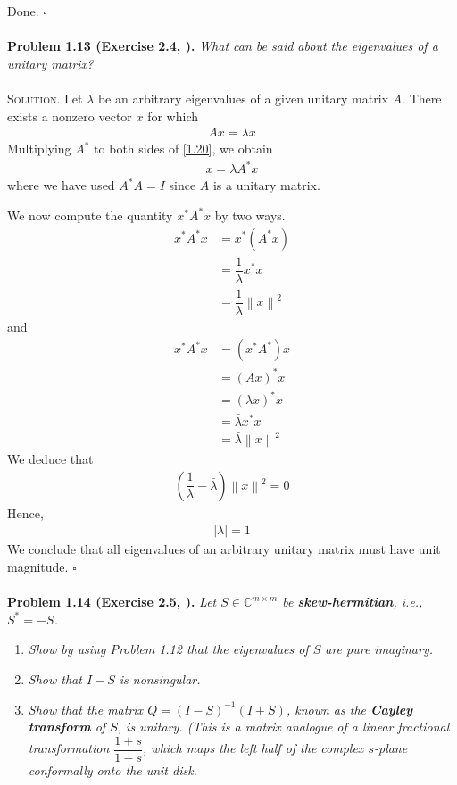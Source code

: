\documentclass[a4paper,oneside]{book}
\numberwithin{equation}{chapter}
\begin{document}
Done. \hfill $\square$\\
\\
\textbf{Problem 1.13 (Exercise 2.4, \cite{1}).} \textit{What can be said about the eigenvalues of a unitary matrix?}\\
\\
\textsc{Solution.} Let $\lambda$ be an arbitrary eigenvalues of a given unitary matrix $A$. There exists a nonzero vector $x$ for which
\begin{align}
\label{1.20}
Ax = \lambda x
\end{align}
Multiplying $A^*$ to both sides of \eqref{1.20}, we obtain
\begin{align}
x = \lambda {A^*}x
\end{align}
where we have used $A^*A=I$ since $A$ is a unitary matrix.

We now compute the quantity ${x^*}{A^*}x$ by two ways.
\begin{align}
{x^*}{A^*}x &= {x^*}\left( {{A^*}x} \right)\\
 &= \dfrac{1}{\lambda }{x^*}x\\
 &= \dfrac{1}{\lambda }{\left\| x \right\|^2}
\end{align}
and
\begin{align}
{x^*}{A^*}x &= \left( {{x^*}{A^*}} \right)x\\
 &= {\left( {Ax} \right)^*}x\\
 &= {\left( {\lambda x} \right)^*}x\\
& = \bar \lambda {x^*}x\\
 &= \bar \lambda {\left\| x \right\|^2}
\end{align}
We deduce that
\begin{align}
\left( {\dfrac{1}{\lambda } - \bar \lambda } \right){\left\| x \right\|^2} = 0
\end{align}
Hence, 
\begin{align}
\left| \lambda  \right| = 1
\end{align}
We conclude that all eigenvalues of an arbitrary unitary matrix must have unit magnitude. \hfill $\square$\\
\\
\textbf{Problem 1.14 (Exercise 2.5, \cite{1}).} \textit{Let $S\in \mathbb{C}^{m \times m}$ be \textbf{skew-hermitian}, i.e., $S^*=-S$.}
\begin{enumerate}
\item \textit{Show by using Problem 1.12 that the eigenvalues of $S$ are pure imaginary.}
\item \textit{Show that $I-S$ is nonsingular.}
\item \textit{Show that the matrix $Q = {\left( {I - S} \right)^{ - 1}}\left( {I + S} \right)$, known as the \textbf{Cayley transform} of $S$, is unitary. (This is a matrix analogue of a linear fractional transformation $\dfrac{{1 + s}}{{1 - s}}$, which maps the left half of the complex $s$-plane conformally onto the unit disk.}
\end{enumerate}
\end{document}
